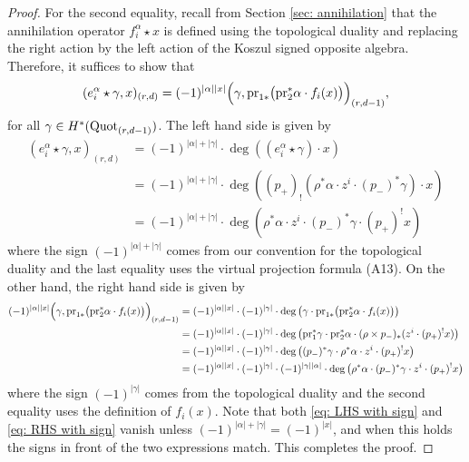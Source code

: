 \documentclass[10pt]{amsart}
\newcommand{\Quot}{\textnormal{Quot}}
\newcommand{\pr}{\textnormal{pr}}
\newcommand{\+}{{}^+}
\theoremstyle{definition}
\theoremstyle {definition}
\theoremstyle {definition}
\begin{document}
\begin{proof}
For the second equality, recall from Section \ref{sec: annihilation} that the annihilation operator $f_i^\alpha\star x $ is defined using the topological duality and replacing the right action by the left action of the Koszul signed opposite algebra. Therefore, it suffices to show that 
$$(e_i^\alpha\star\gamma, x)_{(r,d)} = (-1)^{|\alpha||x|}\Big(\gamma, \pr_{1*}\big(\pr_2^*\alpha\cdot f_i(x)\big)\Big)_{(r,d-1)},
$$
for all $\gamma\in H^*(\Quot_{(r,d-1)})$. The left hand side is given by 
\begin{equation}\label{eq: LHS with sign}
\begin{aligned}
    (e_i^\alpha\star\gamma, x)_{(r,d)}
    &=(-1)^{|\alpha|+|\gamma|}\cdot \deg\left(
    (e_i^\alpha\star \gamma)\cdot x
    \right)\\
    &=(-1)^{|\alpha|+|\gamma|}\cdot \deg\left(
    (p_+)_!(\rho^*\alpha\cdot z^i\cdot (p_-)^*\gamma)\cdot x
    \right)\\
    &=(-1)^{|\alpha|+|\gamma|}\cdot \deg\left(
    \rho^*\alpha\cdot z^i\cdot (p_-)^*\gamma\cdot (p_+)^!x
    \right)
\end{aligned}
\end{equation}
where the sign $(-1)^{|\alpha|+|\gamma|}$ comes from our convention for the topological duality and the last equality uses the virtual projection formula (A13). On the other hand, the right hand side is given by 
\begin{equation}\label{eq: RHS with sign}
\begin{aligned}
    (-1)^{|\alpha||x|}\Big(\gamma, \pr_{1*}\big(\pr_2^*\alpha\cdot f_i(x)\big)\Big)_{(r,d-1)}
    &=(-1)^{|\alpha||x|}\cdot (-1)^{|\gamma|}\cdot
    \deg\left(\gamma\cdot \pr_{1*}\big(\pr_2^*\alpha\cdot f_i(x)\big)
    \right)\\
    &=(-1)^{|\alpha||x|}\cdot (-1)^{|\gamma|}\cdot
    \deg\left(
    \pr_1^*\gamma\cdot \pr_2^*\alpha\cdot (\rho\times p_-)_*(z^i\cdot (p_+)^!x)
    \right)\\
    &=(-1)^{|\alpha||x|}\cdot (-1)^{|\gamma|}\cdot
    \deg\left(
    (p_-)^*\gamma\cdot \rho^*\alpha\cdot z^i\cdot (p_+)^!x
    \right)\\
    &=(-1)^{|\alpha||x|}\cdot (-1)^{|\gamma|}\cdot (-1)^{|\gamma||\alpha|}\cdot
    \deg\left(
    \rho^*\alpha\cdot (p_-)^*\gamma\cdot z^i\cdot (p_+)^!x
    \right)
\end{aligned}
\end{equation}
where the sign $(-1)^{|\gamma|}$ comes from the topological duality and the second equality uses the definition of $f_i(x)$. Note that both \eqref{eq: LHS with sign} and \eqref{eq: RHS with sign} vanish unless $(-1)^{|\alpha|+|\gamma|}=(-1)^{|x|}$, and when this holds the signs in front of the two expressions match. This completes the proof. 

    
\end{proof}
\end{document}
